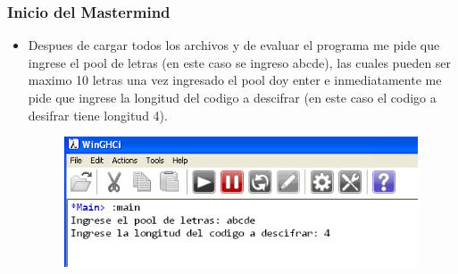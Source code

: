 \subsubsection{Inicio del Mastermind}
 \begin{itemize}
   \item  Despues de cargar todos los archivos y de evaluar el programa me pide que ingrese el pool de letras (en este caso se ingreso abcde), las cuales pueden ser maximo 10 letras una vez ingresado el pool doy enter e inmediatamente me pide que ingrese la longitud del codigo a descifrar (en este caso el codigo a desifrar tiene longitud 4).
        \begin{figure}[htb]
        \centering
        \includegraphics[width=0.99\textwidth]{./imagenes5/img7.png}
        \end{figure}


\end{itemize}
